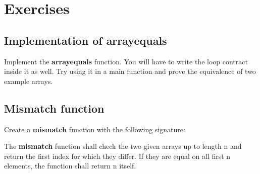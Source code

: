 
\section{Exercises}

\subsection{Implementation of array\textunderscore equals}

Implement the \textbf{array\textunderscore equals} function. You will have to write the loop contract inside it as well. Try using it in a main function and prove the equivalence of two example arrays. 

\subsection{Mismatch function}

Create a \textbf{mismatch} function with the following signature:


The \textbf{mismatch} function shall check the two given arrays up to length n and return the first index for which they differ. If they are equal on all first n elements, the function shall return n itself. 
